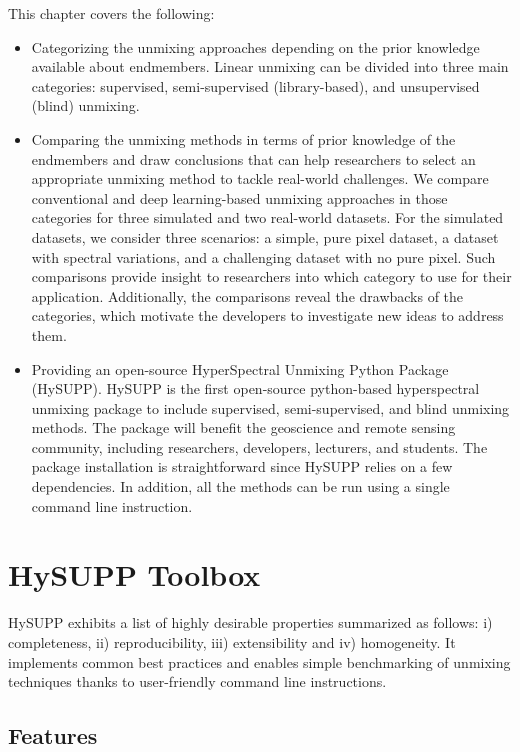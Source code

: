 This chapter covers the following: 
\begin{itemize}
     \item  Categorizing the unmixing approaches depending on the prior knowledge available about endmembers.  Linear unmixing can be divided into three main categories:  supervised, semi-supervised (library-based), and unsupervised (blind) unmixing. 
     \item Comparing the unmixing methods in terms of prior knowledge of the endmembers and draw conclusions that can help researchers to select an appropriate unmixing method to tackle real-world challenges. We compare conventional and deep learning-based unmixing approaches in those categories for three simulated and two real-world datasets.  For the simulated datasets, we consider three scenarios: a simple, pure pixel dataset, a dataset with spectral variations, and a challenging dataset with no pure pixel. Such comparisons provide insight to researchers into which category to use for their application. Additionally, the comparisons reveal the drawbacks of the categories, which motivate the developers to investigate new ideas to address them.
     \item Providing an open-source HyperSpectral Unmixing Python Package (HySUPP). HySUPP is the first open-source python-based hyperspectral unmixing package to include supervised, semi-supervised, and blind unmixing methods.  The package will benefit the geoscience and remote sensing community, including researchers, developers, lecturers, and students. The package installation is straightforward since HySUPP relies on a few dependencies. In addition, all the methods can be run using a single command line instruction. 
 \end{itemize}

\section{HySUPP Toolbox}

HySUPP exhibits a list of highly desirable properties summarized as follows: i) completeness, ii) reproducibility, iii) extensibility and iv) homogeneity. It implements common best practices and enables simple benchmarking of unmixing techniques thanks to user-friendly command line instructions.

\subsection{Features}

